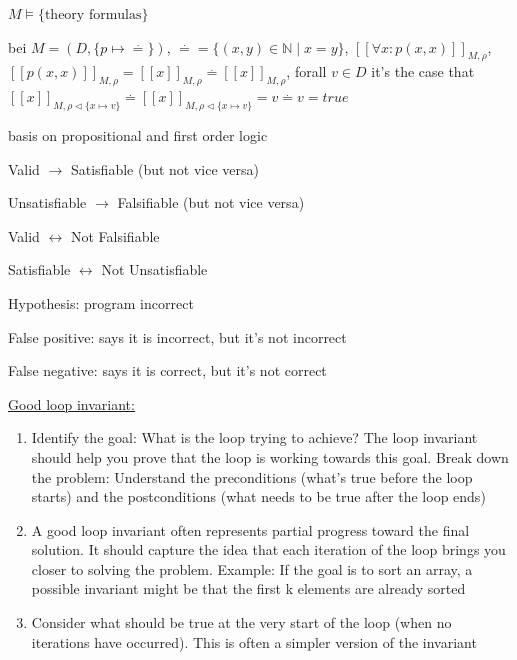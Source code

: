 \documentclass[landscape, a4paper]{article}
\begin{document}
\begin{minipage}[t]{0.2\linewidth}
\begin{betterlist}
		\item $M \models \{\text{theory formulas}\}$
		\item bei $M = (D,\{p \mapsto \overset{.}{=}\})$, $\overset{.}{=} {=} \{(x, y)\in \mathbb{N} \mid x = y\}$, $[[\forall x: p(x, x)]]_{M, \rho}$, $[[p(x, x)]]_{M, \rho} = [[x]]_{M, \rho} \overset{.}{=} [[x]]_{M, \rho}$, forall $v\in D$ it's the case that $[[x]]_{M, \rho\triangleleft\{x \mapsto v\}} \overset{.}{=} [[x]]_{M, \rho\triangleleft\{x \mapsto v\}} = v \overset{.}{=} v = true$
		\item basis on propositional and first order logic
		\begin{betterlist}
			\item Valid $\rightarrow$ Satisfiable (but not vice versa)
			\item Unsatisfiable $\rightarrow$ Falsifiable (but not vice versa)
			\item Valid $\leftrightarrow$ Not Falsifiable
			\item Satisfiable $\leftrightarrow$ Not Unsatisfiable
		\end{betterlist}
		\item \alert{Hypothesis:} program incorrect
		\begin{betterlist}
			\item \alert{False positive:} says it is incorrect, but it's not incorrect
			\item \alert{False negative:} says it is correct, but it's not correct
		\end{betterlist}
		\item \underline{Good loop invariant:}
		\begin{enumerate}
			\item Identify the goal: What is the loop trying to achieve? The loop invariant should help you prove that the loop is working towards this goal.
			Break down the problem: Understand the preconditions (what’s true before the loop starts) and the postconditions (what needs to be true after the loop ends)
			\item A good loop invariant often represents partial progress toward the final solution. It should capture the idea that each iteration of the loop brings you closer to solving the problem. Example: If the goal is to sort an array, a possible invariant might be that the first k elements are already sorted
			\item Consider what should be true at the very start of the loop (when no iterations have occurred). This is often a simpler version of the invariant

\end{enumerate}
\end{betterlist}
\end{minipage}
\end{document}
